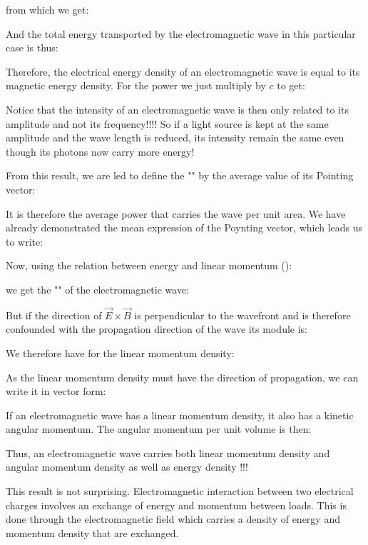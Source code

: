 	from which we get:
	
	And the total energy transported by the electromagnetic wave in this particular case is thus:
	
	Therefore, the electrical energy density of an electromagnetic wave is equal to its magnetic energy density. For the power we just multiply by $c$ to get:
	
	\begin{tcolorbox}[title=Remark,colframe=black,arc=10pt]
	Notice that the intensity of an electromagnetic wave is then only related to its amplitude and not its frequency!!!! So if a light source is kept at the same amplitude and the wave length is reduced, its intensity remain the same even though its photons now carry more energy!
	\end{tcolorbox}
	From this result, we are led to define the "" by the average value of its Pointing vector:
	
	It is therefore the average power that carries the wave per unit area. We have already demonstrated the mean expression of the Poynting vector, which leads us to write:
	
	Now, using the relation between energy and linear momentum ():
	
	we get the "" of the electromagnetic wave:
	
	But if the direction of $\vec{E}\times\vec{B} $ is perpendicular to the wavefront and is therefore confounded with the propagation direction of the wave its module is:
	
	We therefore have for the linear momentum density:
	
	As the linear momentum density must have the direction of propagation, we can write it in vector form:
	
	If an electromagnetic wave has a linear momentum density, it also has a kinetic angular momentum. The angular momentum per unit volume is then:
	
	Thus, an electromagnetic wave carries both linear momentum density and angular momentum density as well as energy density !!!

	This result is not surprising. Electromagnetic interaction between two electrical charges involves an exchange of energy and momentum between loads. This is done through the electromagnetic field which carries a density of energy and momentum density that are exchanged.
		
